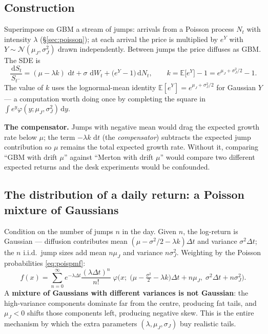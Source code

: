 \documentclass[11pt,a4paper]{article}
\newcommand{\E}{\mathbb{E}}
\newcommand{\dd}{\,\mathrm{d}}
\newcommand{\N}{\mathcal{N}}
\begin{document}
\subsection{Construction}
Superimpose on GBM a stream of jumps: arrivals from a Poisson process $N_t$ with
intensity $\lambda$ (\S\ref{sec:poisson}); at each arrival the price is
multiplied by $e^{Y}$ with $Y\sim\N(\mu_J,\sigma_J^2)$ drawn independently.
Between jumps the price diffuses as GBM. The SDE is
\begin{equation}
\frac{\dd S_t}{S_{t^-}}
=(\mu-\lambda k)\,\dd t+\sigma\,\dd W_t+\big(e^{Y}-1\big)\dd N_t ,
\qquad
k=\E\big[e^{Y}\big]-1=e^{\mu_J+\sigma_J^2/2}-1 .
\label{eq:mertonsde}
\end{equation}
The value of $k$ uses the lognormal-mean identity
$\E[e^{Y}]=e^{\mu_J+\sigma_J^2/2}$ for Gaussian $Y$ --- a computation worth doing
once by completing the square in
$\int e^{y}\varphi(y;\mu_J,\sigma_J^2)\dd y$.

\textbf{The compensator.} Jumps with negative mean would drag the expected
growth rate below $\mu$; the term $-\lambda k\,\dd t$ (the \emph{compensator})
subtracts the expected jump contribution so $\mu$ remains the total expected
growth rate. Without it, comparing ``GBM with drift $\mu$'' against ``Merton
with drift $\mu$'' would compare two different expected returns and the desk
experiments would be confounded.

\subsection{The distribution of a daily return: a Poisson mixture of Gaussians}
Condition on the number of jumps $n$ in the day. Given $n$, the log-return is
Gaussian --- diffusion contributes mean $(\mu-\sigma^2/2-\lambda k)\Delta t$ and
variance $\sigma^2\Delta t$; the $n$ i.i.d.\ jump sizes add mean $n\mu_J$ and
variance $n\sigma_J^2$. Weighting by the Poisson probabilities
\eqref{eq:poispmf}:
\begin{equation}
f(x)=\sum_{n=0}^{\infty}e^{-\lambda\Delta t}\frac{(\lambda\Delta t)^n}{n!}\;
\varphi\!\Big(x;\;\big(\mu-\tfrac{\sigma^2}{2}-\lambda k\big)\Delta t+n\mu_J,\;
\sigma^2\Delta t+n\sigma_J^2\Big).
\label{eq:mertondensity}
\end{equation}
A \textbf{mixture of Gaussians with different variances is not Gaussian}: the
high-variance components dominate far from the centre, producing fat tails, and
$\mu_J<0$ shifts those components left, producing negative skew. This is the
entire mechanism by which the extra parameters $(\lambda,\mu_J,\sigma_J)$ buy
realistic tails.
\end{document}
